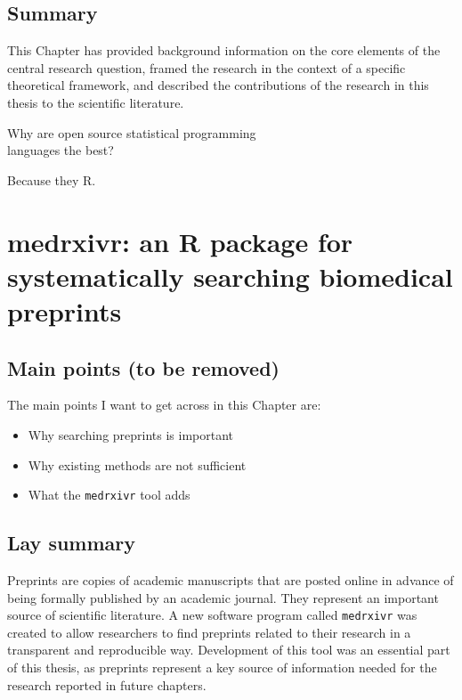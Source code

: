 \documentclass[a4paper, twoside]{templates/ociamthesis}
\begin{document}
\hypertarget{summary}{%
\section{Summary}\label{summary}}

This Chapter has provided background information on the core elements of the central research question, framed the research in the context of a specific theoretical framework, and described the contributions of the research in this thesis to the scientific literature.

\begin{savequote}
Why are open source statistical programming\\
languages the best?

Because they R.
\end{savequote}



\hypertarget{sys-rev-tools-heading}{%
\chapter{medrxivr: an R package for systematically searching biomedical preprints}\label{sys-rev-tools-heading}}

\minitoc 

\hypertarget{main-points-to-be-removed}{%
\section{Main points (to be removed)}\label{main-points-to-be-removed}}

The main points I want to get across in this Chapter are:

\begin{itemize}
\item
  Why searching preprints is important
\item
  Why existing methods are not sufficient
\item
  What the \texttt{medrxivr} tool adds
\end{itemize}

\hypertarget{lay-summary-1}{%
\section{Lay summary}\label{lay-summary-1}}

Preprints are copies of academic manuscripts that are posted online in advance of being formally published by an academic journal. They represent an important source of scientific literature. A new software program called \texttt{medrxivr} was created to allow researchers to find preprints related to their research in a transparent and reproducible way. Development of this tool was an essential part of this thesis, as preprints represent a key source of information needed for the research reported in future chapters.
\end{document}

